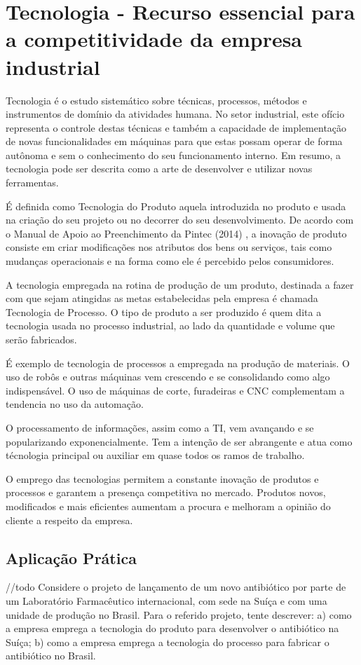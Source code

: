 \chapter{Tecnologia - Recurso essencial para a competitividade da empresa industrial}
\label{chap:tecnologia_recurso}

Tecnologia é o estudo sistemático sobre técnicas, processos, métodos e instrumentos de domínio da atividades humana. No setor industrial, este ofício representa o controle destas técnicas e também a capacidade de implementação de novas funcionalidades em máquinas para que estas possam operar de forma autônoma e sem o conhecimento do seu funcionamento interno. Em resumo, a tecnologia pode ser descrita como a arte de desenvolver e utilizar novas ferramentas.

É definida como Tecnologia do Produto aquela introduzida no produto e usada na criação do seu projeto ou no decorrer do seu desenvolvimento. De acordo com o Manual de Apoio ao Preenchimento da Pintec (2014) %
, a inovação de produto consiste em criar modificações nos atributos dos bens ou serviços, tais como mudanças operacionais e na forma como ele é percebido pelos consumidores.

A tecnologia empregada na rotina de produção de um produto, destinada a fazer com que sejam atingidas as metas estabelecidas pela empresa é chamada Tecnologia de Processo. O tipo de produto a ser produzido é quem dita a tecnologia usada no processo industrial, ao lado da quantidade e volume que serão fabricados.

É exemplo de tecnologia de processos a empregada na produção de materiais. O uso de robôs e outras máquinas vem crescendo e se consolidando como algo indispensável. O uso de máquinas de corte, furadeiras e \ac{CNC} complementam a tendencia no uso da automação.

O processamento de informações, assim como a \ac{TI}, vem avançando e se popularizando exponencialmente. Tem a intenção de ser abrangente e atua como técnologia principal ou auxiliar em quase todos os ramos de trabalho.

O emprego das tecnologias permitem a constante inovação de produtos e processos e garantem a presença competitiva no mercado. Produtos novos, modificados e mais eficientes aumentam a procura e melhoram a opinião do cliente a respeito da empresa.


\section{Aplicação Prática}
\label{sec:tecnologia_recurso_aplicacao}

//todo Considere o projeto de lançamento de um novo antibiótico por parte de um Laboratório Farmacêutico internacional, com sede na Suíça e com
uma unidade de produção no Brasil. Para o referido projeto, tente descrever:
a) como a empresa emprega a tecnologia do produto para desenvolver o
antibiótico na Suíça;
b) como a empresa emprega a tecnologia do processo para fabricar o
antibiótico no Brasil.